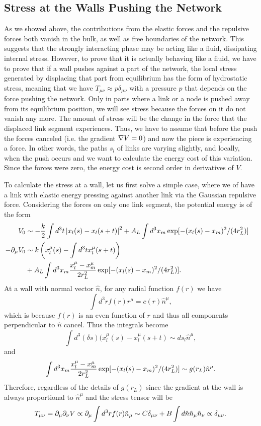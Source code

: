 \documentclass[endfloats,nofootinbib,preprint,floatfix,titlepage,superscriptaddress,linenumbers]{revtex4-1} %
\begin{document}
\subsection{Stress at the Walls Pushing the Network}
As we showed above, the contributions from the elastic forces and the repulsive forces both vanish in the bulk, as well as free boundaries of the network. This suggests that the strongly interacting phase may be acting like a fluid, dissipating internal stress. 
However, to prove that it is actually behaving like a fluid, we have to prove that if a wall pushes against a part of the network, the local stress generated by displacing that part from equilibrium has the form of hydrostatic stress, meaning that we have $T_{\mu\nu} \approx p \delta_{\mu\nu}$ with a pressure $p$ that depends on the force pushing the network. 
Only in parts where a link or a node is pushed away from its equilibrium position, we will see stress because the forces on it do not vanish any more.
The amount of stress will be the change in the force that the displaced link segment experiences.
Thus, we have to assume that before the push the forces canceled (i.e. the gradient $\nabla V = 0$) and now the piece is experiencing a force. 
In other words, the paths $s_l$ of links are varying slightly, and locally, when the push occurs and we want to calculate the energy cost of this variation.
Since the forces were zero, the energy cost is second order in derivatives of $V$. 

To calculate the stress at a wall, let us first solve a simple case, where we of have a link with elastic energy pressing against another link via the Gaussian repulsive force. 
Considering the forces on only one link segment, the potential energy is of the form
\begin{align}
    V_0 &\sim -{k\over 2} \int d^3t \left|x_l(s)- x_l(s+t)\right|^2 + A_L \int d^3 x_m \exp[-(x_l(s) - x_m)^2/ (4r_L^2)]   \cr 
    -\partial_\mu V_0 & \sim k \left(x_l^\mu(s)- \int d^3t x^\mu_l(s+t)\right) \cr & + A_L \int d^3 x_m {x_l^\mu-x_m^\mu  \over 2r_L^2} \exp[-(x_l(s) - x_m)^2/ (4r_L^2)].
\end{align}
At a wall with normal vector $\hat{n}$, for any radial function $f(r)$ we have 
\[\int d^3 r f(r) r^\mu = c(r) \hat{n}^\mu, \]
which is because $f(r) $ is an even function of $r$ and thus all components perpendicular to $\hat{n}$ cancel. 
Thus the integrals become 
\[\int d^3(\delta s) (x_l^\mu (s) - x^\mu_l(s+t) \sim ds_l\hat{n}^\mu,\]
and  
\[\int d^3 x_m {x_l^\mu-x_m^\mu  \over 2r_L^2} \exp[-(x_l(s) - x_m)^2/ (4r_L^2)] \sim g(r_L) \hat{n}^\mu . \]
Therefore, regardless of the details of $g(r_L)$ since the gradient at the wall is always proportional to $\hat{n}^\mu $ and the stress tensor will be 
\[T_{\mu\nu} = \partial_\mu\partial_\nu V \propto \partial_\mu \int d^3r f(r)\hat{n}_\mu \sim C \delta_{\mu\nu} + B\int d\hat{n} \hat{n}_\mu \hat{n}_\nu \propto \delta_{\mu\nu}. \]
\end{document}
